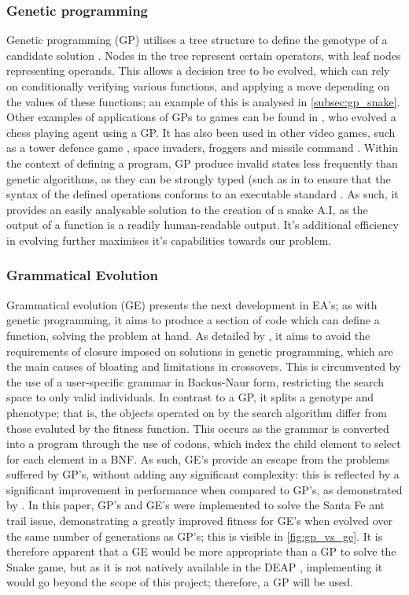\documentclass[british,10pt,a4paper]{article}
\begin{document}
\subsubsection{Genetic programming}
\label{subsec:gp}
Genetic programming (GP) utilises a tree structure to define the genotype of a candidate solution \cite{Cramer_undated-bj}. Nodes in the tree represent certain operators, with leaf nodes representing operands. This allows a decision tree to be evolved, which can rely on conditionally verifying various functions, and applying a move depending on the values of these functions; an example of this is analysed in \autoref{subsec:gp_snake}. Other examples of applications of GPs to games can be found in \citet{Hauptman2005-zg}, who evolved a chess playing agent using a GP. It has also been used in other video games, such as a tower defence game \cite{Leong2013-pu}, space invaders, froggers and missile command \cite{Jia2015-jk}. Within the context of defining a program, GP produce invalid states less frequently than genetic algorithms, as they can be strongly typed (such as in \cite{Jia2015-jk} to ensure that the syntax of the defined operations conforms to an executable standard \cite{Chen2012-ei}. As such, it provides an easily analysable solution to the creation of a snake A.I, as the output of a function is a readily human-readable output. It's additional efficiency in evolving further maximises it's capabilities towards our problem.

\subsubsection{Grammatical Evolution}
Grammatical evolution (GE) presents the next development in EA's; as with genetic programming, it aims to produce a section of code which can define a function, solving the problem at hand. As detailed by \citet{ryan:1998:geepal}, it aims to avoid the requirements of closure imposed on solutions in genetic programming, which are the main causes of bloating and limitations in crossovers. This is circumvented by the use of a user-specific grammar in Backus-Naur form, restricting the search space to only valid individuals. In contrast to a GP, it splits a genotype and phenotype; that is, the objects operated on by the search algorithm differ from those evaluted by the fitness function. This occurs as the grammar is converted into a program through the use of codons, which index the child element to select for each element in a BNF.  As such, GE's provide an escape from the problems suffered by GP's, without adding any significant complexity: this is reflected by a significant improvement in performance when compared to GP's, as demonstrated by \citet{Michael_ONeill1999-zi}. In this paper, GP's and GE's were implemented to solve the Santa Fe ant trail issue, demonstrating a greatly improved fitness for GE's when evolved over the same number of generations as GP's; this is visible in \autoref{fig:gp_vs_ge}. It is therefore apparent that a GE would be more appropriate than a GP to solve the Snake game, but as it is not natively available in the DEAP \cite{deap}, implementing it would go beyond the scope of this project; therefore, a GP will be used.
\end{document}
